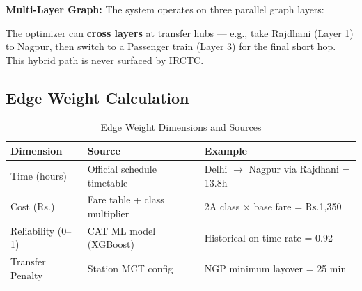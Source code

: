 \documentclass[12pt,a4paper]{report}
\begin{document}
\textbf{Multi-Layer Graph:} The system operates on three parallel graph layers:

\begin{tcolorbox}[enhanced, colback=lightgray!30, colframe=darkgray, title=The Three-Layer Network Architecture, fonttitle=\bfseries]
\centering
{}
\end{tcolorbox}

The optimizer can \textbf{cross layers} at transfer hubs --- e.g., take Rajdhani (Layer 1) to Nagpur, then switch to a Passenger train (Layer 3) for the final short hop. This hybrid path is never surfaced by IRCTC.

\subsection*{Edge Weight Calculation}

\begin{table}[h!]
\centering
\caption{Edge Weight Dimensions and Sources}
\begin{tabularx}{\textwidth}{lXX}
\toprule
\textbf{Dimension} & \textbf{Source} & \textbf{Example} \\
\midrule
Time (hours) & Official schedule timetable & Delhi $\to$ Nagpur via Rajdhani = 13.8h \\
Cost (Rs.) & Fare table + class multiplier & 2A class $\times$ base fare = Rs.1,350 \\
Reliability (0--1) & CAT ML model (XGBoost) & Historical on-time rate = 0.92 \\
Transfer Penalty & Station MCT config & NGP minimum layover = 25 min \\
\bottomrule
\end{tabularx}
\end{table}
\end{document}
